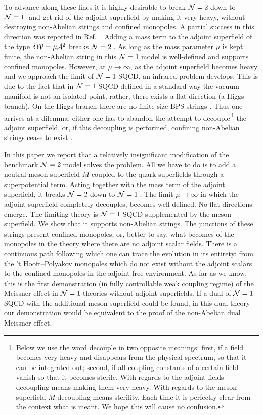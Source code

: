 \documentclass[epsfig,12pt]{article}
\newcommand{\ntwo}{${\cal N}=2\;$}
\newcommand{\none}{${\cal N}=1\;$}
\begin{document}
To advance along these lines it is highly desirable to break \ntwo down to \none 
and get rid of the adjoint superfield by making it very heavy,
without destroying non-Abelian strings and  confined monopoles.
A partial success in this direction was reported in Ref.~\cite{SYnone}.
Adding a mass term to the adjoint superfield of the type
$\delta{\cal W} =\mu {\cal A}^2$ breaks \ntwo. As long as the mass parameter
$\mu$ is kept finite, the non-Abelian string in this \none model
is well-defined and supports confined 
monopoles.
 However, at $\mu\to \infty$,
as the adjoint superfield becomes heavy and we approach the limit of \none SQCD, an infrared problem develops. This is due to the fact that in \none SQCD defined in a standard way the vacuum manifold is not an isolated point;
rather, there exists a flat direction (a Higgs branch). On the Higgs branch 
there are no finite-size BPS strings \cite{ruba}.
Thus one arrives at a dilemma: either one has to abandon the attempt 
to decouple\,\footnote{Below we use the word decouple in two opposite meanings:
first, if a field becomes very heavy and disappears from the physical spectrum,
so that it can be integrated out; second, if all  coupling constants 
of a certain field vanish so that it becomes sterile. 
With regards to the adjoint fields decoupling means making them very heavy.
With regards to the meson superfield $M$ decoupling means sterility. 
Each time it is perfectly clear from the context what is meant. We hope this will cause no confusion.}  the adjoint superfield,
or, if this decoupling is performed, confining non-Abelian strings cease to exist
 \cite{SYnone}.

In this paper we report that a relatively insignificant modification
of the benchmark \ntwo model solves the problem. All we have to do is
to add a neutral meson superfield $M$ coupled to the quark superfields
through a superpotential term.  Acting together with the mass term of the adjoint
superfield, it breaks \ntwo down to \none. The limit $\mu\to\infty$
in which the adjoint superfield completely decouples, becomes well-defined.
No flat directions emerge. The limiting theory is \none SQCD
supplemented by the meson superfield. We show that it supports
non-Abelian strings. The junctions of these strings present confined monopoles,
or, better to say, what becomes of the monopoles in the theory
where there are no adjoint scalar fields. There is a continuous path following which one
can trace the evolution in its entirety: from the 't Hooft--Polyakov monopoles which 
do not exist without the adjoint scalars to the confined monopoles
in the adjoint-free environment. As far as we know, this is the first demonstration
(in fully controllable weak coupling regime)
of the Meissner effect in \none theories without adjoint superfields.
If a dual of
${\cal N} =1$ SQCD with the additional meson superfield
could be found, in this dual theory our demonstration
would be equivalent to the proof of the non-Abelian dual Meissner effect.
\end{document}
